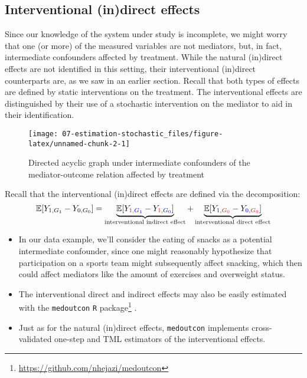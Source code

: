 \documentclass[
  12pt,
]{book}
\newcommand{\passthrough}[1]{#1}
\providecommand{\tightlist}{%
  \setlength{\itemsep}{0pt}\setlength{\parskip}{0pt}}
\renewcommand{\href}[2]{#2\footnote{\url{#1}}}
\theoremstyle{definition}
\theoremstyle{definition}
\theoremstyle{definition}
\newcommand{\E}{\mathbb{E}}
\newcommand{\1}{\mathbbm{1}}
\begin{document}
\hypertarget{interventional-indirect-effects-1}{%
\subsection{Interventional (in)direct effects}\label{interventional-indirect-effects-1}}

Since our knowledge of the system under study is incomplete, we might worry that
one (or more) of the measured variables are not mediators, but, in fact,
intermediate confounders affected by treatment. While the natural (in)direct
effects are not identified in this setting, their interventional (in)direct
counterparts are, as we saw in an earlier section. Recall that both types of
effects are defined by static interventions on the treatment. The interventional
effects are distinguished by their use of a stochastic intervention on the
mediator to aid in their identification.

\begin{figure}
  
  {\centering \texttt{[image: 07-estimation-stochastic\_files/figure-latex/unnamed-chunk-2-1]} 
  
  }
  
  \caption{Directed acyclic graph under intermediate confounders of the mediator-outcome relation affected by treatment}\label{fig:unnamed-chunk-2}
  \end{figure}

Recall that the interventional (in)direct effects are defined via the decomposition:
\begin{equation*}
\E[Y_{1,G_1} - Y_{0,G_0}] = \underbrace{\E[Y_{\color{red}{1},\color{blue}{G_1}} -
    Y_{\color{red}{1},\color{blue}{G_0}}]}_{\text{interventional indirect effect}} +
    \underbrace{\E[Y_{\color{blue}{1},\color{red}{G_0}} -
    Y_{\color{blue}{0},\color{red}{G_0}}]}_{\text{interventional direct effect}}
\end{equation*}

\begin{itemize}
\tightlist
\item
  In our data example, we'll consider the eating of snacks as a potential
  intermediate confounder, since one might reasonably hypothesize that
  participation on a sports team might subsequently affect snacking, which then
  could affect mediators like the amount of exercises and overweight status.
\item
  The interventional direct and indirect effects may also be easily estimated
  with the \href{https://github.com/nhejazi/medoutcon}{\passthrough{\lstinline!medoutcon!} \passthrough{\lstinline!R!} package}
  \citep{hejazi2021medoutcon}.
\item
  Just as for the natural (in)direct effects, \passthrough{\lstinline!medoutcon!} implements
  cross-validated one-step and TML estimators of the interventional effects.
\end{itemize}
\end{document}
